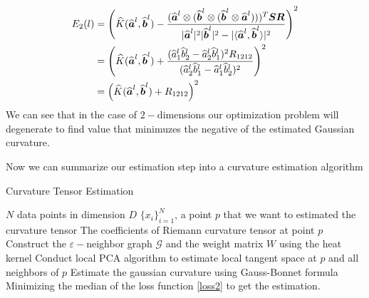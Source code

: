 \documentclass{article}
\begin{document}
\begin{align}
	\notag
	E_2(l)&=\left(\widehat{K}(\widehat{\boldsymbol{a}}^l,\widehat{\boldsymbol{b}}^l)-\frac{(\widehat{\boldsymbol{a}}^l\otimes(\widehat{\boldsymbol{b}}^l\otimes(\widehat{\boldsymbol{b}}^l\otimes\widehat{\boldsymbol{a}}^l)))^T\boldsymbol{S}\boldsymbol{R}}{|\widehat{\boldsymbol{a}}^l|^2|\widehat{\boldsymbol{b}}^l|^2-|\langle \widehat{\boldsymbol{a}}^l,\widehat{\boldsymbol{b}}^l\rangle|^2}\right)^2 \\
	\notag
	&=\left(\widehat{K}(\widehat{\boldsymbol{a}}^l,\widehat{\boldsymbol{b}}^l)+\frac{(\widehat{a}_1^l\widehat{b}_2^l-\widehat{a}_2^l\widehat{b}_1^l)^2R_{1212}}{(\widehat{a}_2^l\widehat{b}_1^l-\widehat{a}_1^l\widehat{b}_2^l)^2}\right)^2 \\
	&=\left(\widehat{K}(\widehat{\boldsymbol{a}}^l,\widehat{\boldsymbol{b}}^l)+R_{1212}\right)^2 
\end{align}
We can see that in the case of $2-$dimensions our optimization problem will degenerate to find value that minimuzes the negative of the estimated Gaussian curvature.
\par
Now we can summarize our estimation step into a curvature estimation algorithm
\begin{algorithm}
	\renewcommand{\algorithmicrequire}{\textbf{Input:}}
	\renewcommand{\algorithmicensure}{\textbf{Output:}}
	\caption{Curvature Tensor Estimation}
	\begin{algorithmic}[1]
	\REQUIRE $N$ data points in dimension $D$ $\{x_i\}_{i=1}^N$, a point $p$ that we want to estimated the curvature tensor
	\ENSURE The coefficients of Riemann curvature tensor at point $p$
	\STATE Construct the $\varepsilon-$neighbor graph $\mathcal{G}$ and the weight matrix $W$ using the heat kernel
	\STATE Conduct local PCA algorithm to estimate local tangent space at $p$ and all neighbors of $p$
		 	\STATE Estimate the gaussian curvature using Gauss-Bonnet formula
		 \ENDIF
	\ENDFOR
	\STATE Minimizing the median of the loss function \ref{loss2} to get the estimation.
	\end{algorithmic}
\end{algorithm}


\end{document}
